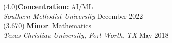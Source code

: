 
 	 (4.0)\hfill \textbf{Concentration:} AI/ML\\
\textit{Southern Methodist University}  \hfill December 2022\\

  (3.670) \hfill \textbf{Minor:} Mathematics\\
\textit{Texas Christian University, Fort Worth, TX}  \hfill May 2018\\